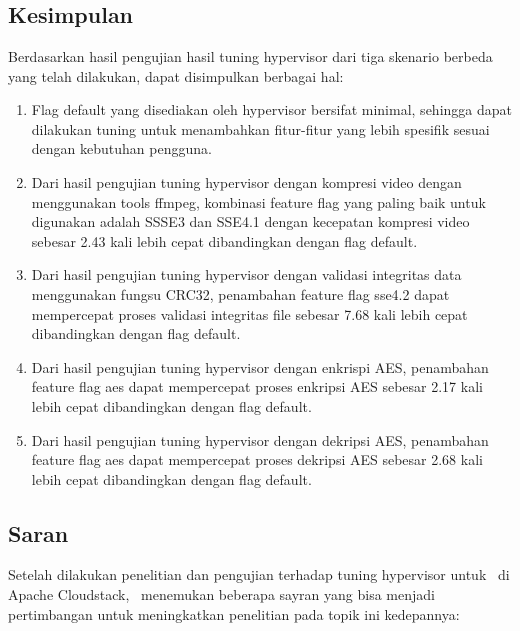 \chapter{\babLima}


\section{Kesimpulan}
Berdasarkan hasil pengujian hasil tuning hypervisor dari tiga skenario berbeda yang telah dilakukan, dapat disimpulkan berbagai hal:

\begin{enumerate}
	\item Flag default yang disediakan oleh hypervisor bersifat minimal, sehingga dapat dilakukan tuning untuk menambahkan fitur-fitur yang lebih spesifik sesuai dengan kebutuhan pengguna.
	\item Dari hasil pengujian tuning hypervisor dengan kompresi video dengan menggunakan tools ffmpeg, kombinasi feature flag yang paling baik untuk digunakan adalah SSSE3 dan SSE4.1 dengan kecepatan kompresi video sebesar 2.43 kali lebih cepat dibandingkan dengan flag default.
	\item Dari hasil pengujian tuning hypervisor dengan validasi integritas data menggunakan fungsu CRC32, penambahan feature flag sse4.2 dapat mempercepat proses validasi integritas file sebesar 7.68 kali lebih cepat dibandingkan dengan flag default.
	\item Dari hasil pengujian tuning hypervisor dengan enkrispi AES, penambahan feature flag aes dapat mempercepat proses enkripsi AES sebesar 2.17 kali lebih cepat dibandingkan dengan flag default.
	\item Dari hasil pengujian tuning hypervisor dengan dekripsi AES, penambahan feature flag aes dapat mempercepat proses dekripsi AES sebesar 2.68 kali lebih cepat dibandingkan dengan flag default.
\end{enumerate}

\section{Saran}
Setelah dilakukan penelitian dan pengujian terhadap tuning hypervisor untuk \vm\ di Apache Cloudstack, \saya\ menemukan beberapa sayran yang bisa menjadi pertimbangan untuk meningkatkan penelitian pada topik ini kedepannya:

